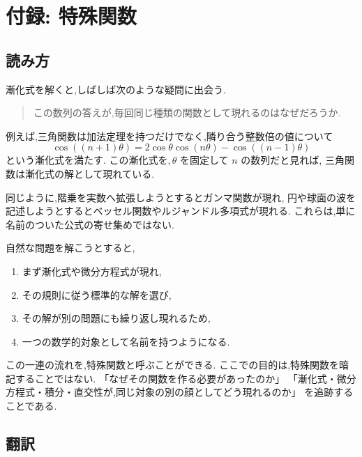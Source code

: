 
\chapter{付録: 特殊関数}

\section*{読み方}

漸化式を解くと,しばしば次のような疑問に出会う.

\begin{quote}
  この数列の答えが,毎回同じ種類の関数として現れるのはなぜだろうか.
\end{quote}

例えば,三角関数は加法定理を持つだけでなく,隣り合う整数倍の値について
\[
  \cos((n+1)\theta)
  =2\cos\theta\cos(n\theta)-\cos((n-1)\theta)
\]
という漸化式を満たす.
この漸化式を,\,$\theta$ を固定して $n$ の数列だと見れば,
三角関数は漸化式の解として現れている.

同じように,階乗を実数へ拡張しようとするとガンマ関数が現れ,
円や球面の波を記述しようとするとベッセル関数やルジャンドル多項式が現れる.
これらは,単に名前のついた公式の寄せ集めではない.

自然な問題を解こうとすると,
\begin{enumerate}
  \item まず漸化式や微分方程式が現れ,
  \item その規則に従う標準的な解を選び,
  \item その解が別の問題にも繰り返し現れるため,
  \item 一つの数学的対象として名前を持つようになる.
\end{enumerate}

この一連の流れを,特殊関数と呼ぶことができる.
ここでの目的は,特殊関数を暗記することではない.
「なぜその関数を作る必要があったのか」
「漸化式・微分方程式・積分・直交性が,同じ対象の別の顔としてどう現れるのか」
を追跡することである.

\section{翻訳}

